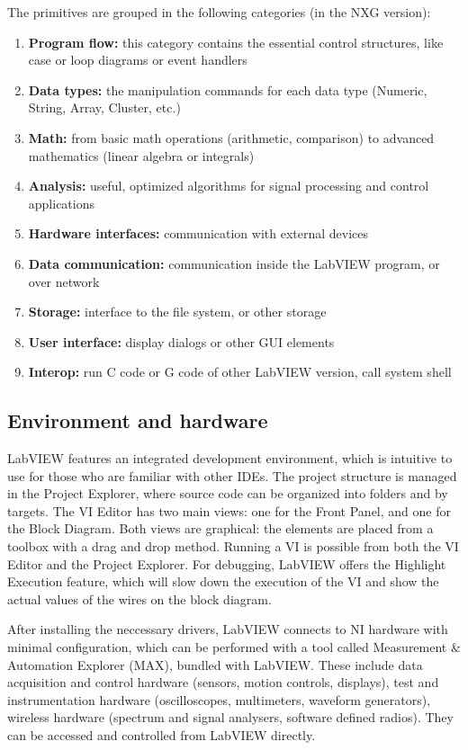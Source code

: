 The primitives are grouped in the following categories (in the NXG version):
\begin{enumerate}
   \item \textbf{Program flow:} this category contains the essential control structures, like case or loop diagrams or event handlers
   \item \textbf{Data types:} the manipulation commands for each data type (Numeric, String, Array, Cluster, etc.)
   \item \textbf{Math:} from basic math operations (arithmetic, comparison) to advanced mathematics (linear algebra or integrals)
      \item \textbf{Analysis:} useful, optimized algorithms for signal processing and control applications
      \item \textbf{Hardware interfaces:} communication with external devices
            \item \textbf{Data communication:} communication inside the LabVIEW program, or over network
                  \item \textbf{Storage:} interface to the file system, or other storage
                        \item \textbf{User interface:} display dialogs or other GUI elements
         \item \textbf{Interop:} run C code or G code of other LabVIEW version, call system shell
\end{enumerate}
\subsection{Environment and hardware}
LabVIEW features an integrated development environment, which is intuitive to use for those who are familiar with other IDEs. The project structure is managed in the Project Explorer, where source code can be organized into folders and by targets. The VI Editor has two main views: one for the Front Panel, and one for the Block Diagram. Both views are graphical: the elements are placed from a toolbox with a drag and drop method. Running a VI is possible from both the VI Editor and the Project Explorer. For debugging, LabVIEW offers the Highlight Execution feature, which will slow down the execution of the VI and show the actual values of the wires on the block diagram.

After installing the neccessary drivers, LabVIEW connects to NI hardware with minimal configuration, which can be performed with a tool called Measurement \& Automation Explorer (MAX), bundled with LabVIEW. These include data acquisition and control hardware (sensors, motion controls, displays), test and instrumentation hardware (oscilloscopes, multimeters, waveform generators), wireless hardware (spectrum and signal analysers, software defined radios). They can be accessed and controlled from LabVIEW directly.


